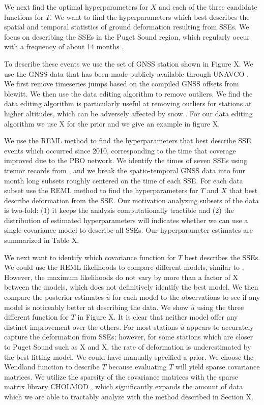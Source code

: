 \documentclass[10pt,a4paper]{article}
\begin{document}
We next find the optimal hyperparameters for $X$ and each of the three candidate functions for $T$. We want to find the hyperparameters which best describes the spatial and temporal statistics of ground deformation resulting from SSEs. We focus on describing the SSEs in the Puget Sound region, which regularly occur with a frequency of about 14 months \citep{Brudzinski2007}. 

To describe these events we use the set of GNSS station shown in Figure X. We use the GNSS data that has been made publicly available through UNAVCO \citep{Herring2016}. We first remove timeseries jumps based on the compiled GNSS offsets from blewitt. We then use the data editing algorithm to remove outliers. We find the data editing algorithm is particularly useful at removing outliers for stations at higher altitudes, which can be adversely affected by snow \citep{Lisowski2008}. For our data editing algorithm we use X for the prior and we give an example in figure X.        

We use the REML method to find the hyperparameters that best describe SSE events which occurred since 2010, corresponding to the time that coverage improved due to the PBO network.  We identify the times of seven SSEs using tremor records from \cite{Wech2010}, and we break the spatio-temporal GNSS data into four month long subsets roughly centered on the time of each SSE. For each data subset use the REML method to find the hyperparameters for $T$ and $X$ that best describe deformation from the SSE. Our motivation analyzing subsets of the data is two-fold: (1) it keeps the analysis computationally tractible and (2) the distribution of estimated hyperparameters will indicates whether we can use a single covariance model to describe all SSEs. Our hyperparameter estimates are summarized in Table X. 

We next want to identify which covariance function for $T$ best describes the SSEs. We could use the REML likelihoods to compare different models, similar to \citep{Langbein2004}. However, the maximum likelihoods do not vary by more than a factor of X between the models, which does not definitively identify the best model. We then compare the posterior estimates $\hat{u}$ for each model to the observations to see if any model is noticeably better at describing the data. We show $\hat{u}$ using the three different function for $T$ in Figure X. It is clear that neither model offer any distinct improvement over the others. For most stations $\hat{u}$ appears to accurately capture the deformation from SSEs; however, for some stations which are closer to Puget Sound such as X and X, the rate of deformation is underestimated by the best fitting model. We could have manually specified a prior. We choose the Wendland function to describe $T$ because evaluating $T$ will yield sparse covariance matrices. We utilize the sparsity of the covariance matrices with the sparse matrix library CHOLMOD \citep{Chen2008}, which significantly expands the amount of data which we are able to tractably analyze with the method described in Section X.   
 
\end{document}

